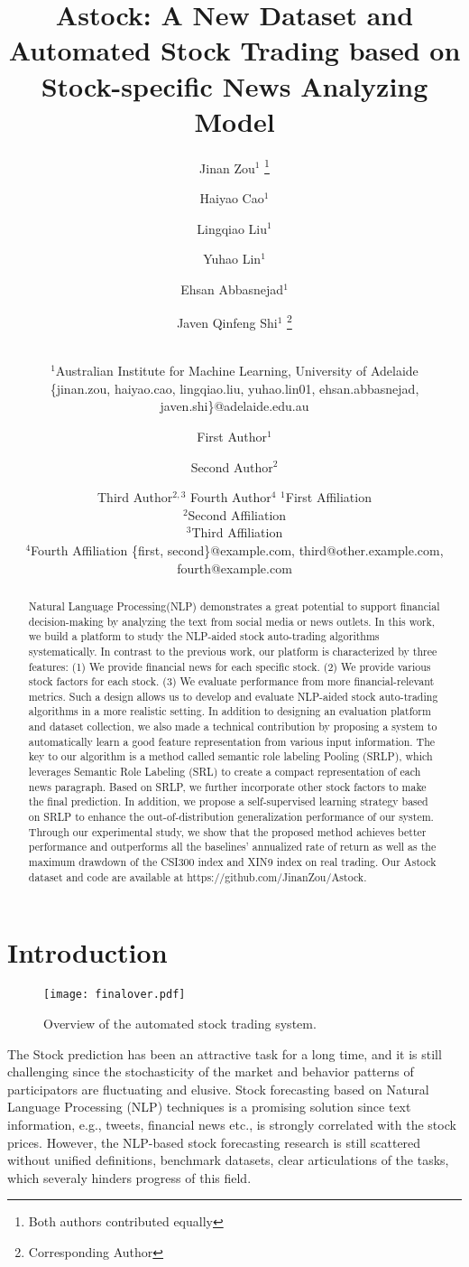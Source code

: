 \documentclass{article}
\title{Astock: A New Dataset and Automated Stock Trading based on Stock-specific News Analyzing Model}
\author{
Jinan Zou$^1$ \footnote{Both authors contributed equally}\and
Haiyao Cao$^1$ \footnotemark[1]\and
Lingqiao Liu$^1$\and
Yuhao Lin$^1$ \and
Ehsan Abbasnejad$^1$ \and
Javen Qinfeng Shi$^1$ \footnote{Corresponding Author} \and
\\
\affiliations
$^1$Australian Institute for Machine Learning, University of Adelaide\\
\emails
\{jinan.zou, haiyao.cao, lingqiao.liu, yuhao.lin01, ehsan.abbasnejad, javen.shi\}@adelaide.edu.au
}
\author{
First Author$^1$
\and
Second Author$^2$\and
Third Author$^{2,3}$\And
Fourth Author$^4$
\affiliations
$^1$First Affiliation\\
$^2$Second Affiliation\\
$^3$Third Affiliation\\
$^4$Fourth Affiliation
\emails
\{first, second\}@example.com,
third@other.example.com,
fourth@example.com
}
\begin{document}
\maketitle

\begin{abstract}
Natural Language Processing(NLP) demonstrates a great potential to support financial decision-making by analyzing the text from social media or news outlets. In this work, we build a platform to study the NLP-aided stock auto-trading algorithms systematically. In contrast to the previous work, our platform is characterized by three features: (1) We provide financial news for each specific stock. (2) We provide various stock factors for each stock. (3) We evaluate performance from more financial-relevant metrics. Such a design allows us to develop and evaluate NLP-aided stock auto-trading algorithms in a more realistic setting. In addition to designing an evaluation platform and dataset collection, we also made a technical contribution by proposing a system to automatically learn a good feature representation from various input information. The key to our algorithm is a method called semantic role labeling Pooling (SRLP), which leverages Semantic Role Labeling (SRL) to create a compact representation of each news paragraph. Based on SRLP, we further incorporate other stock factors to make the final prediction. In addition, we propose a self-supervised learning strategy based on SRLP to enhance the out-of-distribution generalization performance of our system. Through our experimental study,  we show that the proposed method achieves better performance and outperforms all the baselines' annualized rate of return as well as the maximum drawdown of the CSI300 index and XIN9 index on real trading. Our Astock dataset and code are available at https://github.com/JinanZou/Astock.

\end{abstract}

\section{Introduction}
\begin{figure}[t]
\begin{center}  
   \texttt{[image: finalover.pdf]}
\end{center}
\caption{Overview of the automated stock trading system.}
\label{tradingsystem}
\end{figure}
The Stock prediction has been an attractive task for a long time, and it is still challenging since the stochasticity of the market and behavior patterns of participators are fluctuating and elusive. Stock forecasting based on Natural Language Processing (NLP) techniques is a promising solution since text information, e.g., tweets, financial news etc., is strongly correlated with the stock prices. However, the NLP-based stock forecasting research is still scattered without unified definitions, benchmark datasets, clear articulations of the tasks, which severaly hinders progress of this field.
\end{document}

